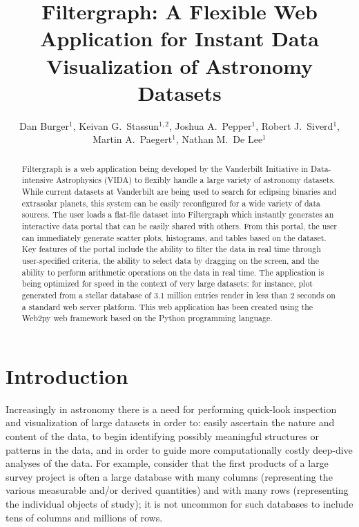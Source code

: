 \documentclass[11pt,twoside]{article}
\begin{document}
\title{Filtergraph: A Flexible Web Application for Instant Data Visualization of Astronomy Datasets}
\author{Dan Burger$^1$, Keivan G.\ Stassun$^{1,2}$, Joshua A.\ Pepper$^1$,
Robert J.\ Siverd$^1$, Martin A.\ Paegert$^1$, Nathan M.\ De Lee$^1$
}

\begin{abstract}
Filtergraph is a web application being developed by the Vanderbilt Initiative
in Data-intensive Astrophysics (VIDA) to flexibly handle a large variety
of astronomy datasets. While current datasets at Vanderbilt are being used
to search for eclipsing binaries and extrasolar planets, this system can
be easily reconfigured for a wide variety of data sources. The user loads
a flat-file dataset into Filtergraph which instantly generates an interactive
data portal that can be easily shared with others. From this portal, the user
can immediately generate scatter plots, histograms, and tables based on the
dataset. Key features of the portal include the ability to filter the data
in real time through user-specified criteria, the ability to select data by
dragging on the screen, and the ability to perform arithmetic operations
on the data in real time. The application is being optimized for speed in
the context of very large datasets: for instance, plot generated from a stellar
database of 3.1 million entries render in less than 2 seconds on a
standard web server platform. This web application has been created using
the Web2py web framework based on the Python programming language. 
\end{abstract}

\section{Introduction}
Increasingly in astronomy there is a need for performing quick-look
inspection and visualization of large datasets in order to: easily
ascertain the nature and content of the data, to begin identifying
possibly meaningful structures or patterns in the data, and in order to guide
more computationally costly deep-dive analyses of the data. For example,
consider that the first products of a large survey project is often a
large database with many columns (representing the various measurable
and/or derived quantities) and with many rows (representing the individual
objects of study); it is not uncommon for such databases to include tens
of columns and millions of rows.
\end{document}
